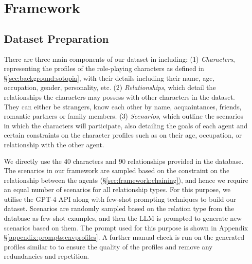 \section{\lifelongsotopia Framework}
\label{sec:framework}

\subsection{Dataset Preparation}
\label{sec:framework:dataset}
There are three main components of our dataset in \sotopia including: (1) \textit{Characters}, representing the profiles of the role-playing characters as defined in \S \ref{sec:background:sotopia}, with their details including their name, age, occupation, gender, personality, etc. (2) \textit{Relationships}, which detail the relationships the characters may possess with other characters in the dataset. They can either be strangers, know each other by name, acquaintances, friends, romantic partners or family members. (3) \textit{Scenarios}, which outline the scenarios in which the characters will participate, also detailing the goals of each agent and certain constraints on the character profiles such as on their age, occupation, or relationship with the other agent.

We directly use the 40 characters and 90 relationships provided in the \sotopia database. The scenarios in our framework are sampled based on the constraint on the relationship between the agents (\S \ref{sec:framework:chaining}), and hence we require an equal number of scenarios for all relationship types. For this purpose, we utilise the GPT-4 API along with few-shot prompting techniques to build our dataset. Scenarios are randomly sampled based on the relation type from the \sotopia database as few-shot examples, and then the LLM is prompted to generate new scenarios based on them. The prompt used for this purpose is shown in Appendix \S \ref{appendix:prompts:envprofiles}. A further manual check is run on the generated profiles similar to \sotopia to ensure the quality of the profiles and remove any redundancies and repetition. 

